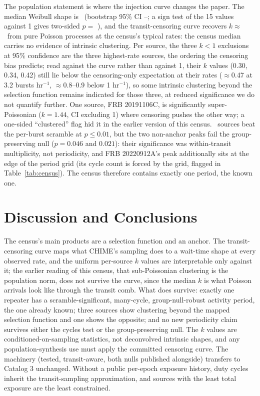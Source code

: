 \documentclass[twocolumn]{aastex631}
\begin{document}
The population statement is where the injection curve changes the paper. The median Weibull
shape is \fwRealMedianK\ (bootstrap 95\% CI \fwRealMedianKlo--\fwRealMedianKhi; a sign test
of the 15 values against 1 gives two-sided $p=$ \fwRealSignP), and the transit-censoring curve
recovers $k\approx$ \fwRealBiasKMidRate\ from pure Poisson processes at the census's typical
rates: the census median carries no evidence of intrinsic clustering. Per source, the three
$k<1$ exclusions at 95\% confidence are the three highest-rate sources, the ordering the
censoring bias predicts; read against the curve rather than against 1, their $k$ values
(0.30, 0.34, 0.42) still lie below the censoring-only expectation at their rates ($\approx$0.47
at 3.2 bursts hr$^{-1}$, $\approx$0.8--0.9 below 1 hr$^{-1}$), so some intrinsic clustering
beyond the selection function remains indicated for those three, at reduced significance we do
not quantify further. One source, FRB 20191106C, is significantly super-Poissonian
($k=1.44$, CI excluding 1) where censoring pushes the other way; a one-sided ``clustered''
flag hid it in the earlier version of this census. \fwRealNPeriodic\ sources beat the
per-burst scramble at $p\le0.01$, but the two non-anchor peaks fail the group-preserving null
($p=0.046$ and $0.021$): their significance was within-transit multiplicity, not periodicity,
and FRB 20220912A's peak additionally sits at the edge of the period grid (its cycle count is
forced by the grid, flagged in Table~\ref{tab:census}). The census therefore contains exactly
one period, the known one.

\section{Discussion and Conclusions}
The census's main products are a selection function and an anchor. The transit-censoring
curve maps what CHIME's sampling does to a wait-time shape at every observed rate, and the
uniform per-source $k$ values are interpretable only against it; the earlier reading of this
census, that sub-Poissonian clustering is the population norm, does not survive the curve,
since the median $k$ is what Poisson arrivals look like through the transit comb. What does
survive: exactly one repeater has a scramble-significant, many-cycle, group-null-robust
activity period, the one already known; three sources show clustering beyond the mapped
selection function and one shows the opposite; and no new periodicity claim survives either
the cycles test or the group-preserving null. The $k$ values are conditioned-on-sampling
statistics, not deconvolved intrinsic shapes, and any population-synthesis use must apply the
committed censoring curve. The machinery (tested, transit-aware, both nulls published
alongside) transfers to Catalog 3 unchanged. Without a public per-epoch exposure history,
duty cycles inherit the transit-sampling approximation, and sources with the least total
exposure are the least constrained.
\end{document}
